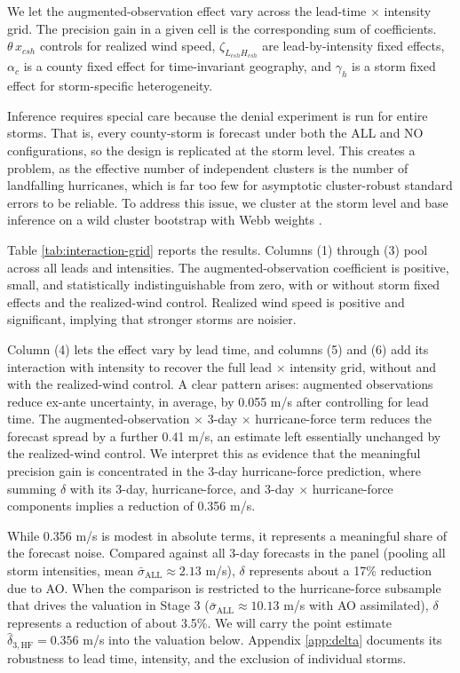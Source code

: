 \documentclass[12pt]{article}%
\begin{document}
We let the augmented-observation effect vary across the lead-time $\times$ intensity grid. The precision gain in a given cell is the corresponding sum of coefficients. $\theta\,x_{csh}$ controls for realized wind speed, $\zeta_{L_{csh}H_{csh}}$ are lead-by-intensity fixed effects, $\alpha_c$ is a county fixed effect for time-invariant geography, and $\gamma_h$ is a storm fixed effect for storm-specific heterogeneity.

Inference requires special care because the denial experiment is run for entire storms. That is, every county-storm is forecast under both the ALL and NO configurations, so the design is replicated at the storm level. This creates a problem, as the effective number of independent clusters is the number of landfalling hurricanes, which is far too few for asymptotic cluster-robust standard errors to be reliable. To address this issue, we cluster at the storm level and base inference on a wild cluster bootstrap with Webb weights \citep{CameronGelbachMiller2008, Webb2014}.

Table \ref{tab:interaction-grid} reports the results. Columns (1) through (3) pool across all leads and intensities.  The augmented-observation coefficient is positive, small, and statistically indistinguishable from zero, with or without storm fixed effects and the realized-wind control. Realized wind speed is positive and significant, implying that stronger storms are noisier.



Column (4) lets the effect vary by lead time, and columns (5) and (6) add its interaction with intensity to recover the full lead $\times$ intensity grid, without and with the realized-wind control. A clear pattern arises: augmented observations reduce ex-ante uncertainty, in average, by 0.055 m/s after controlling for lead time. The augmented-observation $\times$ 3-day $\times$ hurricane-force term reduces the forecast spread by a further 0.41 m/s, an estimate left essentially unchanged by the realized-wind control. We interpret this as evidence that the meaningful precision gain is concentrated in the 3-day hurricane-force prediction, where summing $\delta$ with its 3-day, hurricane-force, and 3-day $\times$ hurricane-force components implies a reduction of 0.356 m/s.

While 0.356 m/s is modest in absolute terms, it represents a meaningful share of the forecast noise. Compared against all 3-day forecasts in the panel (pooling all storm intensities, mean $\bar{\sigma}_{\text{ALL}} \approx 2.13$ m/s), $\delta$ represents about a 17\% reduction due to AO. When the comparison is restricted to the hurricane-force subsample that drives the valuation in Stage 3 ($\bar{\sigma}_{\text{ALL}} \approx 10.13$ m/s with AO assimilated), $\delta$ represents a reduction of about 3.5\%. We will carry the point estimate $\hat{\delta}_{3,\text{HF}} = 0.356$ m/s into the valuation below. Appendix \ref{app:delta} documents its robustness to lead time, intensity, and the exclusion of individual storms.
\end{document}
